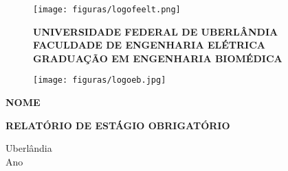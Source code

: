 \documentclass[12pt]{article}
\begin{document}
\thispagestyle{empty}

\begin{figure}[h]
  \centering
  \begin{minipage}[b]{0.11\textwidth}
    \centering
    \texttt{[image: figuras/logofeelt.png]}
  \end{minipage}
  \hfill
  \begin{minipage}[b]{0.6\textwidth}
    \begin{center}\textbf{
        UNIVERSIDADE FEDERAL DE UBERLÂNDIA \\
        FACULDADE DE ENGENHARIA ELÉTRICA \\
        GRADUAÇÃO EM ENGENHARIA BIOMÉDICA
        }
    \end{center}
  \end{minipage}
  \hfill
  \begin{minipage}[b]{0.15\textwidth}
    \centering
    \texttt{[image: figuras/logoeb.jpg]}
  \end{minipage}
\end{figure}

\vfill
\begin{center}
    \large{\textbf{NOME}}
\end{center}

\vfill
\begin{center}
\textbf{RELATÓRIO DE ESTÁGIO OBRIGATÓRIO
}
\end{center}

\vfill
\begin{center}
Uberlândia \\
Ano
\end{center}

\newpage
\end{document}
